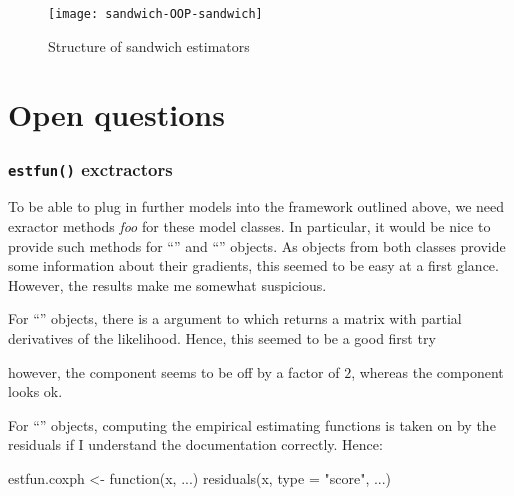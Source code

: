 \documentclass{Z}
\begin{document}
\begin{figure}[tbh]
\begin{center}
\texttt{[image: sandwich-OOP-sandwich]}
\caption{\label{fig:sandwich} Structure of sandwich estimators}
\end{center}
\end{figure}

\section{Open questions}

\subsubsection*{\texttt{estfun()} exctractors}

To be able to plug in further models into the framework outlined above, we
need exractor methods \textit{foo}\code{()} for these model
classes. In particular, it would be nice to provide such methods for ``''
and ``'' objects. As objects from both classes provide some 
information about their gradients, this seemed to be easy at a first glance.
However, the results make me somewhat suspicious. 

For ``'' objects, there is a  argument
to  which returns a matrix with partial derivatives of
the likelihood. Hence, this seemed to be a good first try

\begin{Schunk}
\end{Schunk}

however, the  component seems to be off by a factor of $2$, whereas
the  component looks ok.

For ``'' objects, computing the empirical estimating functions
is taken on by the  residuals if I understand the
documentation correctly. Hence:
\begin{Schunk}
\begin{Sinput}
estfun.coxph <- function(x, ...) residuals(x, type = "score", ...)
\end{Sinput}
\end{Schunk}
\end{document}
